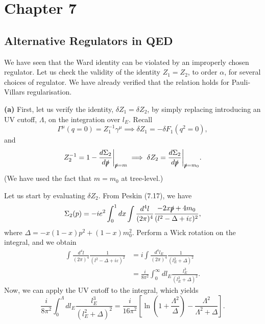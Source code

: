 \documentclass[11pt]{article}
\theoremstyle{definition}
\begin{document}
\section{Chapter 7}
\subsection{Alternative Regulators in QED}
We have seen that the Ward identity can be violated by an improperly chosen regulator. Let us check the validity of the identity $Z_1=Z_2$, to order $\alpha$, for several choices of regulator. We have already verified that the relation holds for Pauli-Villars regularisation.

\textbf{(a)} First, let us verify the identity, $\delta Z_1 = \delta Z_2$, by simply replacing introducing an UV cutoff, $\Lambda$, on the integration over $l_E$. Recall
\begin{equation}
    \Gamma^\mu(q=0) =  Z_1^{-1}\gamma^\mu \implies \delta Z_1 =  -\delta F_1(q^2=0),
\end{equation}
and
\begin{equation}
    Z_2^{-1} = 1-\frac{d\Sigma_2}{d\slashed{p}}\bigg|_{\slashed{p}=m} \implies \delta Z_2 = \frac{d\Sigma_2}{d\slashed{p}}\bigg|_{\slashed{p}=m_0}.
\end{equation}
(We have used the fact that $m=m_0$ at tree-level.)

Let us start by evaluating $\delta Z_2$. From Peskin (7.17), we have
\begin{equation}
    \Sigma_2(p)  = -ie^2\int^1_0 dx\int\frac{d^4l}{(2\pi)^4}\frac{-2x\slashed{p}+4m_0}{(l^2-\Delta+i\varepsilon)^2},
\end{equation}
where $\Delta = -x(1-x)p^2+(1-x)m_0^2$. Perform a Wick rotation on the integral, and we obtain
\begin{equation}
\begin{aligned}
    \int\frac{d^4l}{(2\pi)^4}\frac{1}{(l^2-\Delta+i\varepsilon)^2} &= i\int\frac{d^4l_E}{(2\pi)^4}\frac{1}{(l_E^2+\Delta)^2}\\
    &=\frac{i}{8\pi^2}\int_0^\infty dl_E\frac{l_E^3}{(l_E^2+\Delta)^2}.
\end{aligned}
\end{equation}
Now, we can apply the UV cutoff to the integral, which yields
\begin{equation}
    \frac{i}{8\pi^2}\int_0^\Lambda dl_E\frac{l_E^3}{(l_E^2+\Delta)^2}=\frac{i}{16\pi^2}\left[\ln\left(1+\frac{\Lambda^2}{\Delta}\right)-\frac{\Lambda^2}{\Lambda^2+\Delta}\right].
\end{equation}
\end{document}
